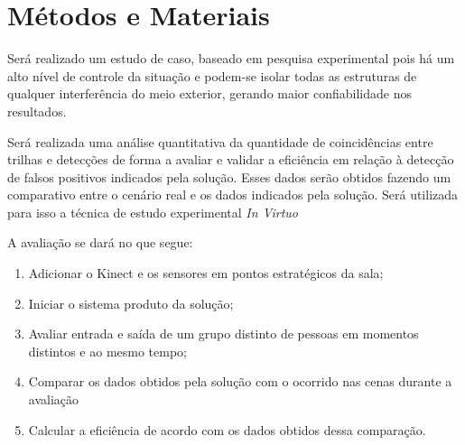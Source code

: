 \section{Métodos e Materiais}\label{sec:metodos-e-materiais}


Será realizado um estudo de caso, baseado em pesquisa experimental pois há um alto nível de controle da situação e podem-se isolar todas as estruturas de qualquer interferência do meio exterior, gerando maior confiabilidade nos resultados.

Será realizada uma análise quantitativa da quantidade de coincidências entre trilhas e detecções de forma a avaliar e validar a eficiência em relação à detecção de falsos positivos indicados pela solução. Esses dados serão obtidos fazendo um comparativo entre o cenário real e os dados indicados pela solução. Será utilizada para isso a técnica de estudo experimental \textit{In Virtuo}

A avaliação se dará no que segue:

\begin{enumerate}
\item Adicionar o Kinect e os sensores em pontos estratégicos da sala;
\item Iniciar o sistema produto da solução;
\item Avaliar entrada e saída de um grupo distinto de pessoas em momentos distintos e ao mesmo tempo;
\item Comparar os dados obtidos pela solução com o ocorrido nas cenas durante a avaliação
\item Calcular a eficiência de acordo com os dados obtidos dessa comparação.
\end{enumerate}


%